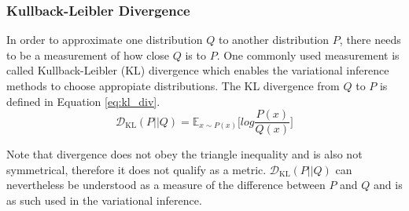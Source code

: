 \subsubsection{Kullback-Leibler Divergence}
In order to approximate one distribution $Q$ to another distribution $P$, there needs to be a measurement of how close $Q$ is to $P$.
One commonly used measurement is called Kullback-Leibler (KL) divergence\cite{kl_div:1951} which enables the variational inference methods to choose appropiate distributions.
The KL divergence from $Q$ to $P$ is defined in Equation \ref{eq:kl_div}.
\begin{equation}
  \label{eq:kl_div}
  \mathcal{D}_{\mathrm{KL}}(P || Q) = \mathbb{E}_{x \sim P(x)}\bigg[log \frac{P(x)}{Q(x)}\bigg]
\end{equation}

Note that divergence does not obey the triangle inequality and is also not symmetrical, therefore it does not qualify as a metric.
$\mathcal{D}_{\mathrm{KL}}(P||Q)$ can nevertheless be understood as a measure of the difference between $P$ and $Q$ and is as such used in the variational inference.


\newpage





